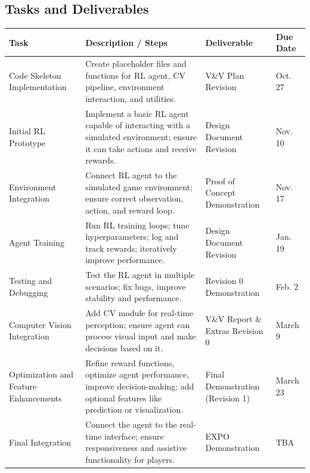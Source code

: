 \documentclass{article}
\begin{document}
  \subsection{Tasks and Deliverables}\label{subsec:tasks}
  \begin{table}[H]
    \centering
    \begin{tabular}{|p{3cm}|p{5cm}|p{3cm}|p{2cm}|}
    \hline
    \textbf{Task} & \textbf{Description / Steps} & \textbf{Deliverable} & \textbf{Due Date} \\ \hline
    
    Code Skeleton Implementation & Create placeholder files and functions for RL agent, CV pipeline, environment interaction, and utilities. & V\&V Plan Revision & Oct. 27 \\ \hline
    
    Initial RL Prototype & Implement a basic RL agent capable of interacting with a simulated environment; ensure it can take actions and receive rewards. & Design Document Revision & Nov. 10 \\ \hline
    
    Environment Integration & Connect RL agent to the simulated game environment; ensure correct observation, action, and reward loop. & Proof of Concept Demonstration & Nov. 17 \\ \hline
    
    Agent Training & Run RL training loops; tune hyperparameters; log and track rewards; iteratively improve performance. & Design Document Revision & Jan. 19 \\ \hline
    
    Testing and Debugging & Test the RL agent in multiple scenarios; fix bugs, improve stability and performance. & Revision 0 Demonstration & Feb. 2 \\ \hline
    
    Computer Vision Integration & Add CV module for real-time perception; ensure agent can process visual input and make decisions based on it. & V\&V Report \& Extras Revision 0 & March 9 \\ \hline
    
    Optimization and Feature Enhancements & Refine reward functions, optimize agent performance, improve decision-making; add optional features like prediction or visualization. & Final Demonstration (Revision 1) & March 23 \\ \hline
    
    Final Integration & Connect the agent to the real-time interface; ensure responsiveness and assistive functionality for players. & EXPO Demonstration & TBA \\ \hline
    

\end{tabular}
\end{table}
\end{document}
